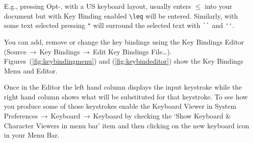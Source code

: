 \documentclass[letterpaper,11pt]{article}
\newcommand{\cmd}[1]{\textsf{#1}}
\newcommand{\mnu}[1]{\textsf{#1}}
\newcommand{\To}{\,\(\to\)\,}
\begin{document}
\begin{figure}
\begin{floatrow}
%
\end{floatrow}
\end{figure}

E.g., pressing \cmd{Opt-,} with a US keyboard layout, usually enters \texttt{\(\leq\)} into your document but with Key Binding enabled \verb|\leq| will be entered. Similarly, with some text selected pressing \verb|"| will surround the selected text with \verb|``| and \verb|''|.

You can add, remove or change the key bindings using the Key Bindings Editor (\mnu{Source}\To\mnu{Key Bindings}\To\mnu{Edit Key Bindings File…}). Figures~(\ref{fig:keybindingmenu}) and (\ref{fig:keybindeditor}) show the \mnu{Key Bindings} Menu and Editor.

Once in the Editor the left hand column displays the input keystroke while the right hand column shows what will be substituted for that keystroke. To see how you produce some of those keystrokes enable the Keyboard Viewer in \mnu{System Preferences}\To\mnu{Keyboard}\To\mnu{Keyboard} by checking the `\mnu{Show Keyboard \& Character Viewers in menu bar}' item and then clicking on the new keyboard icon in your Menu Bar.
\end{document}

